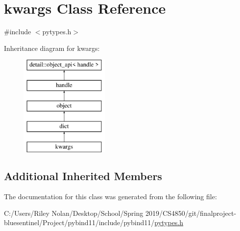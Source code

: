 \hypertarget{classkwargs}{}\section{kwargs Class Reference}
\label{classkwargs}


{\ttfamily \#include $<$pytypes.\+h$>$}

Inheritance diagram for kwargs\+:\begin{figure}[H]
\begin{center}
\leavevmode
\includegraphics[height=5.000000cm]{classkwargs}
\end{center}
\end{figure}
\subsection*{Additional Inherited Members}


The documentation for this class was generated from the following file\+:\begin{DoxyCompactItemize}
\item 
C\+:/\+Users/\+Riley Nolan/\+Desktop/\+School/\+Spring 2019/\+C\+S4850/git/finalproject-\/bluesentinel/\+Project/pybind11/include/pybind11/\mbox{\hyperlink{pytypes_8h}{pytypes.\+h}}\end{DoxyCompactItemize}
